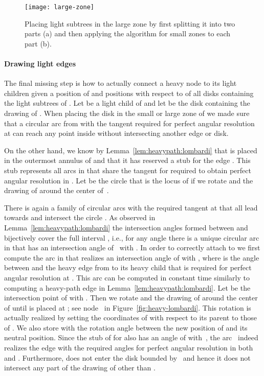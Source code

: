 \documentclass[11pt]{article}
\begin{document}
\begin{figure}[tb]
  \centering
  \texttt{[image: large-zone]}
  \caption{Placing light subtrees in the large zone by first splitting
  it into two parts (a) and then applying the algorithm for small
  zones to each part (b).}
  \label{fig:children-large-zone}
\end{figure}

\paragraph{Drawing light edges}

The final missing step is how to actually connect a heavy node 
to its light children given a position of  and positions with respect to  of all disks containing the light subtrees of . Let  be a light child of 
and let  be the disk containing the drawing of . When
placing the disk  in the small or large zone of  we made
sure that a circular arc from  with the tangent required for
perfect angular resolution at  can reach any point inside 
without intersecting another edge or disk. 

On the other hand, we know by Lemma~\ref{lem:heavypath:lombardi} that
 is placed in the outermost annulus of  and that it has reserved a stub for the edge . This stub represents all arcs in  that share the tangent for  required to obtain perfect angular resolution in . 
Let  be the circle that is the locus of  if we rotate  and the drawing of  around the center of~.

There is again a family  of circular arcs with the
required tangent at  that all lead towards  and intersect the
circle . As observed in Lemma~\ref{lem:heavypath:lombardi} the
intersection angles formed between  and  bijectively
cover the full interval , i.e., for any angle  there is a unique circular arc in  that has an
intersection angle of~ with . In order to correctly
attach  to  we first compute the arc  in  that
realizes an intersection angle of  with , where
 is the angle between  and the heavy edge from  to
its heavy child that is required for perfect angular resolution at
. This arc  can be computed in constant time similarly to computing a heavy-path edge in Lemma~\ref{lem:heavypath:lombardi}.
Let  be the intersection point of  with .  Then
we rotate  and the drawing of  around the center of 
until  is placed at ; see node~ in
Figure~\ref{fig:heavy-lombardi}. 
This rotation is actually realized by setting the coordinates of  with respect to its parent  to those of . 
We also store with  the rotation angle between the new position of  and its neutral position.
Since the stub of  for  also has an angle of  with~, the arc~ indeed realizes the edge  with the required angles for perfect angular resolution in both  and . 
Furthermore,  does not enter the disk bounded by~ and hence it does not intersect any part of the drawing of  other than . 
\end{document}

